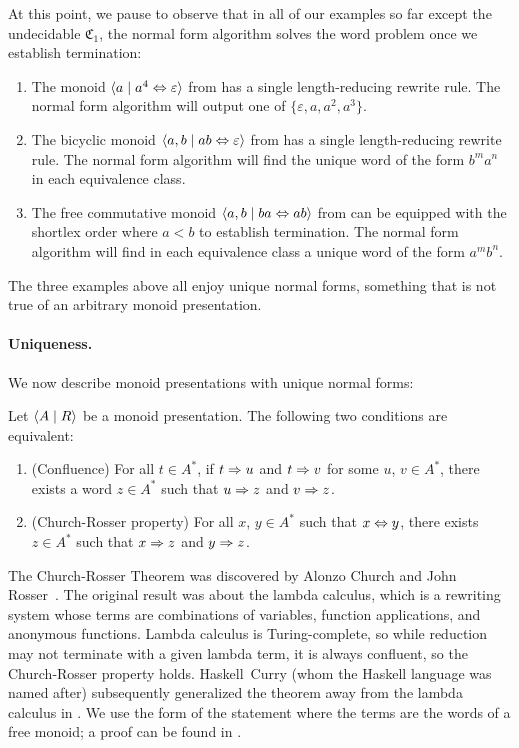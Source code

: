 \documentclass[../generics]{subfiles}
\begin{document}
At this point, we pause to observe that in all of our examples so far except the undecidable $\mathfrak{C}_1$, the normal form algorithm solves the word problem once we establish termination:
\begin{enumerate}
\item The monoid $\langle a \mid a^4\Leftrightarrow\varepsilon\rangle$ from  has a single length-reducing rewrite rule. The normal form algorithm will output one of $\{\varepsilon,a,a^2,a^3\}$.
\item The bicyclic monoid $\langle a, b \mid ab\Leftrightarrow\varepsilon\rangle$ from  has a single length-reducing rewrite rule. The normal form algorithm will find the unique word of the form $b^m a^n$ in each equivalence class.
\item The free commutative monoid $\langle a,b \mid ba\Leftrightarrow ab\rangle$ from  can be equipped with the shortlex order where $a<b$ to establish termination. The normal form algorithm will find in each equivalence class a unique word of the form $a^m b^n$.
\end{enumerate}
The three examples above all enjoy unique normal forms, something that is not true of an arbitrary monoid presentation.

\paragraph{Uniqueness.}
We now describe monoid presentations with unique normal forms:

\begin{theorem}\label{church rosser theorem}
Let $\langle A \mid R\rangle$ be a monoid presentation. The following two conditions are equivalent:
\begin{enumerate}
\item {}(Confluence) For all $t\in A^*$, if $t\Rightarrow u$ and $t\Rightarrow v$ for some $u$, $v\in A^*$, there exists a word $z\in A^*$ such that $u\Rightarrow z$ and $v\Rightarrow z$.
\item {}(Church-Rosser property) For all $x$, $y\in A^*$ such that $x\Leftrightarrow y$, there exists $z\in A^*$ such that $x\Rightarrow z$ and $y\Rightarrow z$.
\end{enumerate}
\end{theorem}

The Church-Rosser Theorem was discovered by Alonzo Church and John Rosser~\cite{conversion}. The original result was about the lambda calculus, which is a rewriting system whose terms are combinations of variables, function applications, and anonymous functions. Lambda calculus is Turing-complete, so while reduction may not terminate with a given lambda term, it is always confluent, so the Church-Rosser property holds. Haskell~Curry (whom the Haskell language was named after) subsequently generalized the theorem away from the lambda calculus in \cite{combinatory}. We use the form of the statement where the terms are the words of a free monoid; a proof can be found in \cite{book2012string}.
\end{document}
